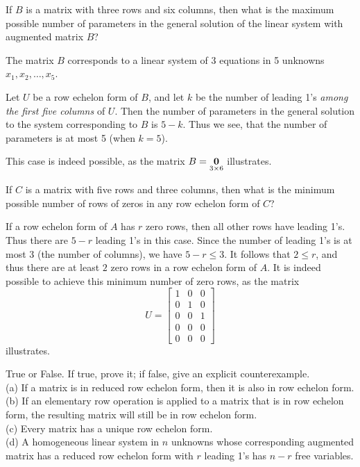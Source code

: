 \ii
\noindent If $B$ is a matrix with three rows and six columns, then what is the maximum possible number of parameters in the general solution of the linear system with augmented matrix $B$?
\\
\begin{solution}
\noindent The matrix $B$ corresponds to a linear system of 3 equations in 5 unknowns $x_1, x_2, \dots, x_5$. 
 
Let $U$ be a row echelon form of $B$, and let $k$ be the number of leading 1's {\em among the first five columns} of $U$. Then the number of parameters in the general solution to the system corresponding to $B$ is $5-k$. Thus we see, that the number of parameters is at most 5 (when $k=5$). 

This case is indeed possible, as the matrix $B=\underset{3\times 6}{{\mathbf 0}}$ illustrates.  
\end{solution}
\ii
\noindent If $C$ is a matrix with five rows and three columns, then what is the minimum possible number of rows of zeros in any row echelon form of $C$?
 \\
\begin{solution}
\noindent If a row echelon form of $A$ has $r$ zero rows, then all other rows have leading 1's. Thus there are $5-r$ leading 1's in this case. Since the number of leading 1's is at most 3 (the number of columns), we have $5-r\leq 3$. It follows that $2\leq r$, and thus there are at least $2$ zero rows in a row echelon form of $A$. It is indeed possible to achieve this minimum number of zero rows, as the matrix \[
U=\begin{bmatrix}
1&0&0\\
0&1&0\\
0&0&1\\
0&0&0\\
0&0&0
\end{bmatrix}
\]
illustrates. 
\end{solution}
\ii
\noindent True or False. If true, prove it; if false, give an explicit counterexample.
\\
(a) If a matrix is in reduced row echelon form, then it is also in row echelon form.
\\
(b) If an elementary row operation is applied to a matrix that is in row echelon form, the resulting matrix will still be in row echelon form.
\\
(c) Every matrix has a unique row echelon form.
\\
(d) A homogeneous linear system in $n$ unknowns whose corresponding augmented matrix has a reduced row echelon form with $r$ leading 1's has $n-r$ free variables.
